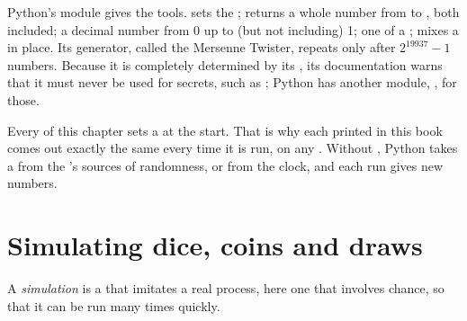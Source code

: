 Python's module  gives the tools.  sets the
;  returns a whole number from  to
, both included;  a decimal number from 0 up to
(but not including) 1;  one  of a ;
 mixes a  in place. Its generator, called the
Mersenne Twister, repeats only after $2^{19937} - 1$ numbers. Because it is
completely determined by its , its documentation warns that it must never be
used for secrets, such as ; Python has another module,
, for those.

\label{lst:g9:randomness-and-simulation:seed}

\label{out:g9:randomness-and-simulation:seed}

Every  of this chapter sets a  at the start. That is why each 
printed in this book comes out exactly the same every time it is run, on any
. Without , Python takes a  from the 's sources of randomness, or from the clock, and each run gives new
numbers.

\section{Simulating dice, coins and draws}

\begin{definition}[Simulation]\label{def:g9:randomness-and-simulation:simulation}
A \emph{simulation} is a  that imitates a real process,
here one that involves chance, so that it can be run many times quickly.
\end{definition}

